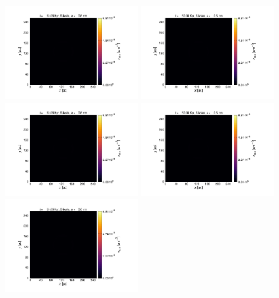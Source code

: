 \documentclass[fleqn,usenatbib]{mnras}
\begin{document}
\begin{figure}
   \includegraphics[trim=2.8cm 1.5cm 9.3cm 2.0cm, clip=true,page=1,height = 3.6cm]{Pics/Pics_A2/Density_1_00201.pdf}\hspace*{-0.05cm}
   \includegraphics[trim=2.8cm 1.5cm 9.3cm 2.0cm, clip=true,page=2,height = 3.6cm]{Pics/Pics_A2/Density_1_00201.pdf}\hspace*{-0.05cm}
   \includegraphics[trim=2.8cm 1.5cm 9.3cm 2.0cm, clip=true,page=3,height = 3.6cm]{Pics/Pics_A2/Density_1_00201.pdf}\hspace*{-0.05cm}
   \includegraphics[trim=5.2cm 1.5cm 3.2cm 2.0cm, clip=true,page=4,height = 3.6cm]{Pics/Pics_A2/Density_1_00201.pdf}\hspace*{-0.05cm}
   \includegraphics[trim=2.8cm 1.5cm 9.3cm 2.0cm, clip=true,page=4,height = 3.6cm]{Pics/Pics_A2/Density_1_00201.pdf}\\  

\end{figure}
\end{document}

